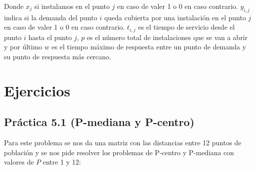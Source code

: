 \documentclass[a4paper,11pt]{article}
\begin{document}
\begin{itemize}
Donde ${x_j}$ si instalamos en el punto ${j}$ en caso de valer 1 o 0 en caso contrario. ${y_{i,j}}$ indica si la demanda del punto ${i}$ queda cubierta por una instalación en el punto ${j}$ en caso de valer 1 o 0 en caso contrario. ${t_{i,j}}$ es el tiempo de servicio desde el punto ${i}$ hasta el punto ${j}$, ${p}$ es el número total de instalaciones que se van a abrir y por último ${w}$ es el tiempo máximo de respuesta entre un punto de demanda y su punto de respuesta más cercano.
\end{itemize}

\newpage
\section{Ejercicios}

\subsection{Práctica 5.1 (P-mediana y P-centro)}

Para este problema se nos da una matriz con las distancias entre 12 puntos de población y se nos pide resolver los problemas de P-centro y P-mediana con valores de ${P}$ entre 1 y 12:
\end{document}
